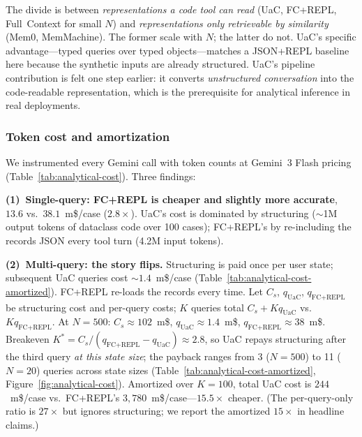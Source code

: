 The divide is between \emph{representations a code tool can read} (UaC, FC+REPL, Full~Context for small $N$) and \emph{representations only retrievable by similarity} (Mem0, MemMachine). The former scale with $N$; the latter do not. UaC's specific advantage---typed queries over typed objects---matches a JSON+REPL baseline here because the synthetic inputs are already structured. UaC's pipeline contribution is felt one step earlier: it converts \emph{unstructured conversation} into the code-readable representation, which is the prerequisite for analytical inference in real deployments.

\subsubsection{Token cost and amortization}



We instrumented every Gemini call with token counts at Gemini~3 Flash pricing (Table~\ref{tab:analytical-cost}). Three findings:

\textbf{(1)~Single-query: FC+REPL is cheaper and slightly more accurate}, $13.6$ vs.\ $38.1$~m\$/case ($2.8\times$). UaC's cost is dominated by structuring ($\sim$1M output tokens of dataclass code over 100 cases); FC+REPL's by re-including the records JSON every tool turn (4.2M input tokens).

\textbf{(2)~Multi-query: the story flips.} Structuring is paid once per user state; subsequent UaC queries cost $\sim$$1.4$~m\$/case (Table~\ref{tab:analytical-cost-amortized}). FC+REPL re-loads the records every time. Let $C_s$, $q_{\text{UaC}}$, $q_{\text{FC+REPL}}$ be structuring cost and per-query costs; $K$ queries total $C_s + K q_{\text{UaC}}$ vs.\ $K q_{\text{FC+REPL}}$. At $N{=}500$: $C_s \approx 102$~m\$, $q_{\text{UaC}} \approx 1.4$~m\$, $q_{\text{FC+REPL}} \approx 38$~m\$. Breakeven $K^* = C_s/(q_{\text{FC+REPL}}-q_{\text{UaC}}) \approx 2.8$, so UaC repays structuring after the third query \emph{at this state size}; the payback ranges from 3 ($N{=}500$) to 11 ($N{=}20$) queries across state sizes (Table~\ref{tab:analytical-cost-amortized}, Figure~\ref{fig:analytical-cost}). Amortized over $K{=}100$, total UaC cost is $244$~m\$/case vs.\ FC+REPL's $3{,}780$~m\$/case---$15.5\times$ cheaper. (The per-query-only ratio is $27\times$ but ignores structuring; we report the amortized $15\times$ in headline claims.)

